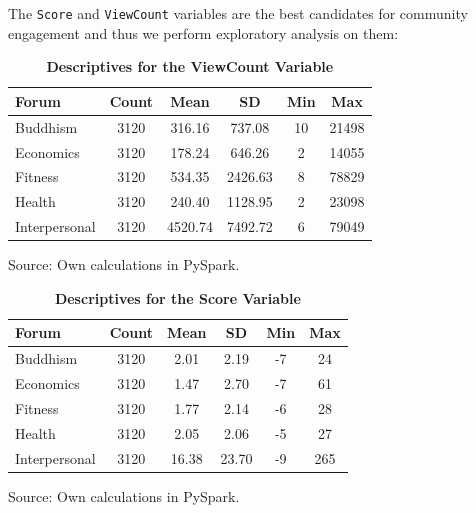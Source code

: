 \documentclass[11pt,preprint, authoryear]{article}
\numberwithin{equation}{section}
\begin{document}
The \texttt{Score} and \texttt{ViewCount} variables are the best
candidates for community engagement and thus we perform exploratory
analysis on them:

\footnotesize

\begin{longtable} {@{} lccccc @{}}
\caption{\textbf{Descriptives for the ViewCount Variable}}
\label{tab:bestworst}\\ 
\toprule
\textbf{Forum} & \textbf{Count} & \textbf{Mean} & \textbf{SD} & \textbf{Min} & \textbf{Max} \\ 
\midrule
Buddhism      &   3120 &   316.16 &   737.08 &   10 &  21498 \\
Economics     &   3120 &   178.24 &   646.26 &    2 &  14055 \\
Fitness       &   3120 &   534.35 &  2426.63 &    8 &  78829 \\
Health        &   3120 &   240.40 &  1128.95 &    2 &  23098 \\
Interpersonal &   3120 &  4520.74 &  7492.72 &    6 &  79049 \\
\bottomrule
\end{longtable}\begin{center} Source: Own calculations in PySpark.\end{center}

\normalsize

\footnotesize

\begin{longtable} {@{} lccccc @{}}
\caption{\textbf{Descriptives for the Score Variable}}
\label{tab:bestworst}\\ 
\toprule
\textbf{Forum} & \textbf{Count} & \textbf{Mean} & \textbf{SD} & \textbf{Min} & \textbf{Max} \\ 
\midrule
Buddhism      &   3120 &   2.01 &    2.19 &   -7 &   24 \\
Economics     &   3120 &   1.47 &    2.70 &   -7 &   61 \\
Fitness       &   3120 &   1.77 &    2.14 &   -6 &   28 \\
Health        &   3120 &   2.05 &    2.06 &   -5 &   27 \\
Interpersonal &   3120 &  16.38 &   23.70 &   -9 &  265 \\
\bottomrule
\end{longtable}\begin{center} Source: Own calculations in PySpark.\end{center}

\normalsize
\end{document}
